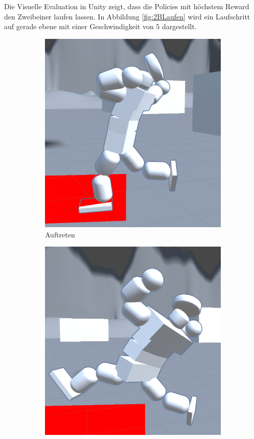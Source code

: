 Die Visuelle Evaluation in Unity zeigt, dass die Policies mit höchstem Reward den Zweibeiner laufen lassen. In Abbildung \ref{fig:2BLaufen} wird ein Laufschritt auf gerade ebene mit einer Geschwindigkeit von $5$ dargestellt.
\begin{figure}
	\centering
	\begin{subfigure}[b]{0.3\textwidth}
		\centering
		\includegraphics[width=\textwidth]{resources/img/Unity1}
		\caption{Auftreten}
		\label{fig:Laufen1}
	\end{subfigure}
	\hfill
	\begin{subfigure}[b]{0.3\textwidth}
		\centering
		\includegraphics[width=\textwidth]{resources/img/Unity2}

\end{subfigure}
\end{figure}
